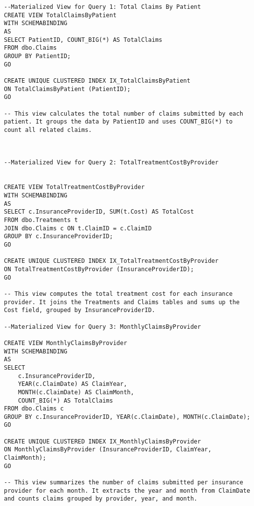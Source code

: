 \begin{lstlisting}[style=sqlstyle, caption={Materialized view creation}, label=lst:MV_creation]
--Materialized View for Query 1: Total Claims By Patient
CREATE VIEW TotalClaimsByPatient
WITH SCHEMABINDING
AS
SELECT PatientID, COUNT_BIG(*) AS TotalClaims
FROM dbo.Claims
GROUP BY PatientID;
GO

CREATE UNIQUE CLUSTERED INDEX IX_TotalClaimsByPatient
ON TotalClaimsByPatient (PatientID);
GO

-- This view calculates the total number of claims submitted by each patient. It groups the data by PatientID and uses COUNT_BIG(*) to count all related claims.



--Materialized View for Query 2: TotalTreatmentCostByProvider


CREATE VIEW TotalTreatmentCostByProvider
WITH SCHEMABINDING
AS
SELECT c.InsuranceProviderID, SUM(t.Cost) AS TotalCost
FROM dbo.Treatments t
JOIN dbo.Claims c ON t.ClaimID = c.ClaimID
GROUP BY c.InsuranceProviderID;
GO

CREATE UNIQUE CLUSTERED INDEX IX_TotalTreatmentCostByProvider
ON TotalTreatmentCostByProvider (InsuranceProviderID);
GO

-- This view computes the total treatment cost for each insurance provider. It joins the Treatments and Claims tables and sums up the Cost field, grouped by InsuranceProviderID.

--Materialized View for Query 3: MonthlyClaimsByProvider

CREATE VIEW MonthlyClaimsByProvider
WITH SCHEMABINDING
AS
SELECT 
    c.InsuranceProviderID, 
    YEAR(c.ClaimDate) AS ClaimYear, 
    MONTH(c.ClaimDate) AS ClaimMonth, 
    COUNT_BIG(*) AS TotalClaims
FROM dbo.Claims c
GROUP BY c.InsuranceProviderID, YEAR(c.ClaimDate), MONTH(c.ClaimDate);
GO

CREATE UNIQUE CLUSTERED INDEX IX_MonthlyClaimsByProvider
ON MonthlyClaimsByProvider (InsuranceProviderID, ClaimYear, ClaimMonth);
GO

-- This view summarizes the number of claims submitted per insurance provider for each month. It extracts the year and month from ClaimDate and counts claims grouped by provider, year, and month.
\end{lstlisting}
